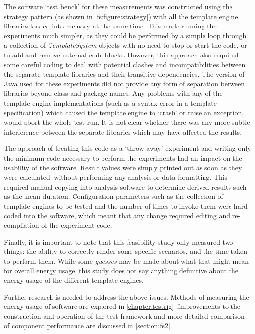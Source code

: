 The software `test bench' for these measurements was constructed using the strategy pattern (as shown in \autoref{fs:figure:strategy}) with all the template engine libraries loaded into memory at the same time. This made running the experiments much simpler, as they could be performed by a simple loop through a collection of \emph{TemplateSystem} objects with no need to stop or start the code, or to add and remove external code blocks. However, this approach also required some careful coding to deal with potential clashes and incompatibilities between the separate template libraries and their transitive dependencies. The version of Java used for these experiments did not provide any form of separation between libraries beyond class and package names. Any problems with any of the template engine implementations (such as a syntax error in a template specification) which caused the template engine to `crash' or raise an exception, would abort the whole test run. It is not clear whether there was any more subtle interference between the separate libraries which may have affected the results.

The approach of treating this code as a `throw away' experiment and writing only the minimum code necessary to perform the experiments had an impact on the usability of the software. Result values were simply printed out as soon as they were calculated, without performing any analysis or data formatting. This required manual copying into analysis software to determine derived results such as the mean duration. Configuration parameters such as the collection of template engines to be tested and the number of times to invoke them were hard-coded into the software, which meant that any change required editing and re-compliation of the experiment code.

Finally, it is important to note that this feasibility study only measured two things: the ability to correctly render some specific scenarios, and the time taken to perform them. While some \emph{guesses} may be made about what that might mean for overall energy usage, this study does not say anything definitive about the energy usage of the different template engines.

Further research is needed to address the above issues. Methods of measuring the energy usage of software are explored in \autoref{chapter:testrig} .Improvements to the construction and operation of the test framework and more detailed  comparison of component performance are discussed in \autoref{section:fs2}.

